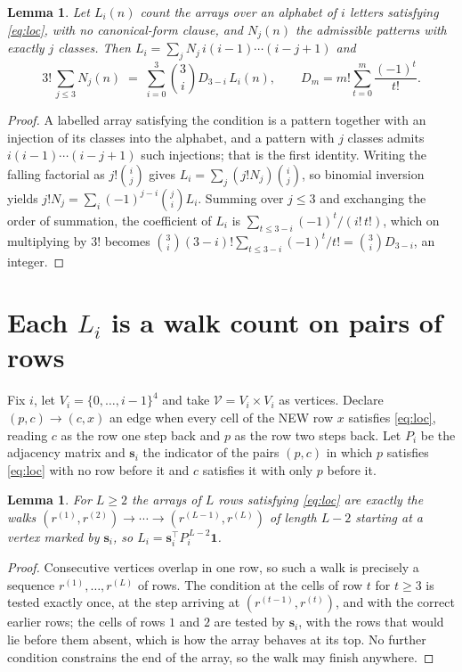 \documentclass[11pt,a4paper]{article}
\theoremstyle{plain}
\newtheorem{lemma}[theorem]{Lemma}
\theoremstyle{definition}
\begin{document}
\begin{lemma}\label{lem:inv}
Let $L_i(n)$ count the arrays over an alphabet of $i$ letters satisfying \eqref{eq:loc},
with no canonical-form clause, and $N_j(n)$ the admissible patterns with exactly $j$ classes.
Then $L_i=\sum_j N_j\,i(i-1)\cdots(i-j+1)$ and
\[
3!\,\sum_{j\le 3}N_j(n)\;=\;\sum_{i=0}^{3}\binom{3}{i}D_{3-i}\,L_i(n),
\qquad D_m=m!\sum_{t=0}^{m}\frac{(-1)^t}{t!} .
\]
\end{lemma}

\begin{proof}
A labelled array satisfying the condition is a pattern together with an injection of its
classes into the alphabet, and a pattern with $j$ classes admits $i(i-1)\cdots(i-j+1)$ such
injections; that is the first identity. Writing the falling factorial as $j!\binom{i}{j}$
gives $L_i=\sum_j(j!N_j)\binom{i}{j}$, so binomial inversion yields
$j!N_j=\sum_i(-1)^{j-i}\binom{j}{i}L_i$. Summing over $j\le3$ and exchanging the
order of summation, the coefficient of $L_i$ is $\sum_{t\le3-i}(-1)^t/(i!\,t!)$, which on
multiplying by $3!$ becomes
$\binom{3}{i}(3-i)!\sum_{t\le3-i}(-1)^t/t!=\binom{3}{i}D_{3-i}$, an
integer.
\end{proof}

\section{Each $L_i$ is a walk count on pairs of rows}

Fix $i$, let $V_i=\{0,\dots,i-1\}^{4}$ and take $\mathcal V=V_i\times V_i$ as vertices.
Declare $(p,c)\to(c,x)$ an edge when every cell of the NEW row $x$ satisfies
\eqref{eq:loc}, reading $c$ as the row one step back and $p$ as the row two steps
back. Let $P_i$ be the adjacency matrix and $\mathbf{s}_i$ the indicator of the pairs
$(p,c)$ in which $p$ satisfies \eqref{eq:loc} with no row before it and $c$ satisfies it
with only $p$ before it.

\begin{lemma}\label{lem:walk}
For $L\ge2$ the arrays of $L$ rows satisfying \eqref{eq:loc} are exactly the walks
$(r^{(1)},r^{(2)})\to\cdots\to(r^{(L-1)},r^{(L)})$ of length $L-2$ starting at a
vertex marked by $\mathbf{s}_i$, so
$L_i=\mathbf{s}_i^{\!\top}P_i^{\,L-2}\mathbf{1}$.
\end{lemma}

\begin{proof}
Consecutive vertices overlap in one row, so such a walk is precisely a sequence
$r^{(1)},\dots,r^{(L)}$ of rows. The condition at the cells of row $t$ for $t\ge3$
is tested exactly once, at the step arriving at $(r^{(t-1)},r^{(t)})$, and with the
correct earlier rows; the cells of rows $1$ and $2$ are tested by $\mathbf{s}_i$, with
the rows that would lie before them absent, which is how the array behaves at its top. No
further condition constrains the end of the array, so the walk may finish anywhere.
\end{proof}
\end{document}
